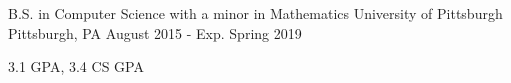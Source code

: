 
\vspace{-7mm}


\vspace{0mm}
\begin{cventries}

  \cventry
    {B.S. in Computer Science with a minor in Mathematics} %
    {University of Pittsburgh} %
    {Pittsburgh, PA} %
    {August 2015 - Exp. Spring 2019} %
    {
      \begin{cvitems} %
        \item {3.1 GPA, 3.4 CS GPA}
      \end{cvitems}
    }
    
  \vspace{-6mm}
  
\end{cventries}